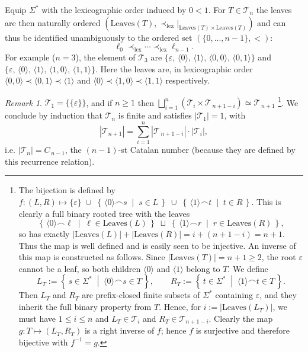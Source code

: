 \documentclass[11pt, a4paper, oneside]{article}
\theoremstyle{remark}
\newtheorem*{remark}{Remark}
\theoremstyle{lemma}
\begin{document}
Equip \(\Sigma^{*}\) with the lexicographic order induced by \(0<1\). For \(T\in\mathcal{T}_n\) the leaves are then naturally ordered \((\mathrm{Leaves}(T),\prec_{\mathrm{lex}}|_{\mathrm{Leaves}(T)\times\mathrm{Leaves}(T)})\) and can thus be identified unambiguously to the ordered set $(\{0,...,n-1\},<)$:
\[
\ell_0\prec_{\mathrm{lex}}\cdots\prec_{\mathrm{lex}}\ell_{n-1}.
\]
For example (\(n=3\)), the element of \(\mathcal{T}_3\) are \(\{\varepsilon,\,\langle 0\rangle,\,\langle 1\rangle,\,\langle 0,0\rangle,\,\langle 0,1\rangle\}\) and \(\{\varepsilon,\,\langle 0\rangle,\,\langle 1\rangle,\,\langle 1,0\rangle,\,\langle 1,1\rangle\}\). Here the leaves are, in lexicographic order \(\langle 0,0\rangle \prec \langle 0,1\rangle \prec \langle 1\rangle\) and \( \langle 0\rangle\prec\langle 1,0\rangle \prec \langle 1,1\rangle\) respectively.
\begin{remark} 
\(\mathcal{T}_1 = \{\{\varepsilon\}\}\), and if \(n \geq 1\) then \(
\bigsqcup_{i=1}^{n} \left(\mathcal{T}_{i} \times \mathcal{T}_{\,n+1-i}\right) \simeq \mathcal{T}_{\,n+1}\)
\footnote{The bijection is defined by \(f : (L,R) \mapsto \{\varepsilon\} \;\cup\; \left\{\,\langle0\rangle \frown s \;\middle|\; s \in L\,\right\} \;\cup\; \left\{\,\langle1\rangle\frown t \;\middle|\; t \in R\,\right\}\).
This is clearly a full binary rooted tree with the leaves
\[
\left\{\,\langle0\rangle \frown \ell \;\middle|\; \ell \in \mathrm{Leaves}(L)\,\right\} \;\sqcup\; \left\{\,\langle1\rangle \frown r \;\middle|\; r \in \mathrm{Leaves}(R)\,\right\},
\]
so has exactly \(\left|\mathrm{Leaves}(L)\right| + \left|\mathrm{Leaves}(R)\right| = i + (n+1-i) = n+1\).
Thus the map is well defined and is easily seen to be injective. An inverse of this map is constructed as follows. Since \(\left|\mathrm{Leaves}(T)\right| = n+1 \geq 2\), the root \(\varepsilon\) cannot be a leaf, so both children \(\langle 0\rangle\) and \(\langle 1\rangle\) belong to \(T\). We define
\[
L_T := \left\{\,s \in \Sigma^* \;\middle|\; \langle0\rangle \frown s \in T\,\right\},\qquad
R_T := \left\{\,t \in \Sigma^* \;\middle|\; \langle1\rangle \frown t \in T\,\right\}.
\]
Then \(L_T\) and \(R_T\) are prefix-closed finite subsets of \(\Sigma^*\) containing \(\varepsilon\), and they inherit the full binary property from \(T\). Hence, for \(i := \left|\mathrm{Leaves}(L_T)\right|\), we must have \(1 \leq i \leq n\) and \(L_T \in \mathcal{T}_i\) and \(R_T \in \mathcal{T}_{n+1-i}\). Clearly the map \(g:T \mapsto (L_T, R_T)\) is a right inverse of \(f\); hence \(f\) is surjective and therefore bijective with $f^{-1}=g$.}.
We conclude by induction that \(\mathcal{T}_n\) is finite and satisfies \(\left|\mathcal{T}_{1}\right| = 1\), with
\[
\left|\mathcal{T}_{n+1}\right|
= \sum_{i=1}^{n} \left|\mathcal{T}_{\,n+1-i}\right| \cdot \left|\mathcal{T}_i\right|,
\]
i.e. \(\left|\mathcal{T}_n\right| = C_{\,n-1}\), the \((n-1)\)-st Catalan number (because they are defined by this recurrence relation).
\end{remark}
\end{document}
